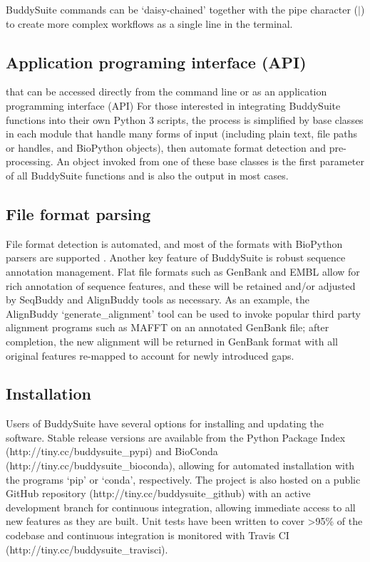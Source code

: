 \documentclass[twocolumn]{bmcart}%
\begin{document}
BuddySuite commands can be `daisy-chained' together with the pipe character ($\vert$) to create more complex workflows as a single line in the terminal. 

\subsection*{Application programing interface (API)}
that can be accessed directly from the command line or as an application programming interface (API)
For those interested in integrating BuddySuite functions into their own Python 3 scripts, the process is simplified by base classes in each module that handle many forms of input (including plain text, file paths or handles, and BioPython objects), then automate format detection and pre-processing. An object invoked from one of these base classes is the first parameter of all BuddySuite functions and is also the output in most cases.

\subsection*{File format parsing}
File format detection is automated, and most of the formats with BioPython parsers are supported \cite{Cock:2009hj}. 
Another key feature of BuddySuite is robust sequence annotation management. Flat file formats such as GenBank and EMBL allow for rich annotation of sequence features, and these will be retained and/or adjusted by SeqBuddy and AlignBuddy tools as necessary. As an example, the AlignBuddy `generate\_alignment' tool can be used to invoke popular third party alignment programs such as MAFFT \cite{Katoh:2013hm} on an annotated GenBank file; after completion, the new alignment will be returned in GenBank format with all original features re-mapped to account for newly introduced gaps.

\subsection*{Installation}
Users of BuddySuite have several options for installing and updating the software. Stable release versions are available from the Python Package Index \cite{pypi} (http://tiny.cc/buddysuite\_pypi) and BioConda \cite{bioconda} (http://tiny.cc/buddysuite\_bioconda), allowing for automated installation with the programs `pip' or `conda', respectively. The project is also hosted on a public GitHub \cite{github} repository (http://tiny.cc/buddysuite\_github) with an active development branch for continuous integration, allowing immediate access to all new features as they are built. Unit tests have been written to cover \textgreater 95\% of the codebase and continuous integration is monitored with Travis CI \cite{travisci} (http://tiny.cc/buddysuite\_travisci).
\end{document}
